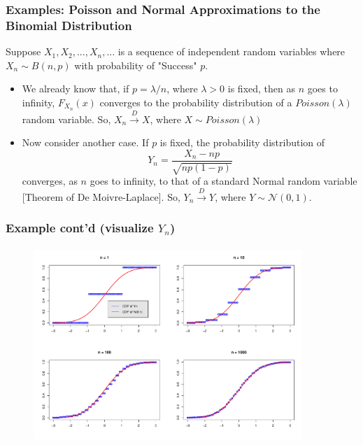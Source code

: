 \documentclass[notes=show,smaller,handout]{beamer}\usepackage[]{graphicx}\usepackage[]{color}
\newenvironment{stepitemize}{\begin{itemize}[<+->]}{\end{itemize} }
\begin{document}
\begin{frame}%

\frametitle{Examples: Poisson and Normal Approximations to the Binomial Distribution}

\begin{example}
Suppose $X_{1},X_{2},...,X_{n},...$ is a sequence of independent
random variables where $X_n\sim B(n,p)$ with probability of "Success" $p$.\bigskip

\begin{stepitemize}

\item We already know that, if $p=\lambda/n$, where $\lambda>0$ is fixed, then as $n$ goes to infinity, $F_{X_{n}}\left( x\right) $ converges to
the probability distribution of a \color{blue}$Poisson\left( \lambda \right) $ \color{black} random variable. So, $X_{n}\overset{D}{\rightarrow }X$, where $X\sim Poisson\left(\lambda \right) $\bigskip

\item Now consider another case. If $p$ is fixed, the probability distribution of
\begin{equation*}
Y_{n}=\frac{X_{n}-np}{\sqrt{np\left( 1-p\right) }}
\end{equation*}
converges, as $n$ goes to infinity, to that of a \color{blue}standard Normal \color{black} random variable [Theorem of De Moivre-Laplace]. So, $Y_
{n}\overset{D}{\rightarrow }Y$, where $Y\sim \mathcal{N}\left(0,1\right) $.

\end{stepitemize}
\end{example}
\end{frame}%

\begin{frame}%

\frametitle{Example cont'd (visualize $Y_{n}$)}

\begin{example}


\begin{figure}[ptb]\centering
\includegraphics[height=2.9in, width=4in]{img/CDF_Rplot.pdf}%
\end{figure}%



\end{example}
\end{frame}%
\end{document}

